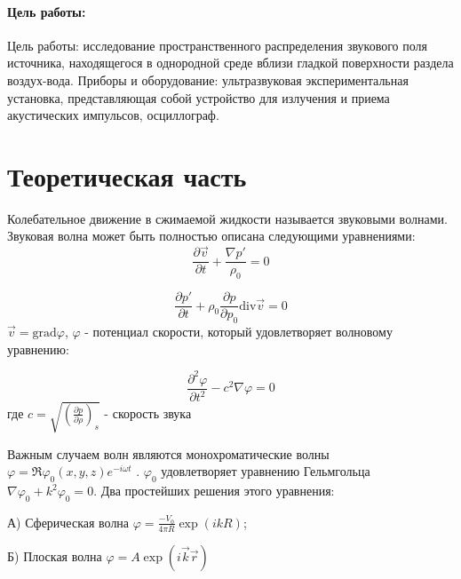 

\def\labauthors{Есюнин Д.В., Есюнин М.В.}
\def\labgroup{440}
\def\labnumber{1}
\def\labtheme{Исследование акустического поля в однородной среде с плоской границей}

\newpage
\renewcommand{\phi}{\varphi}
\renewcommand{\div}{\text{div}}
\renewcommand{\grad}{\text{grad}}

\paragraph{Цель работы:}
Цель работы: исследование пространственного распределения звукового поля источника, находящегося в однородной среде вблизи гладкой поверхности раздела воздух-вода.
Приборы и оборудование: ультразвуковая экспериментальная установка, представляющая собой устройство для излучения и приема акустических импульсов, осциллограф.

\section{Теоретическая часть}
Колебательное движение в сжимаемой жидкости называется звуковыми волнами. Звуковая волна может быть полностью описана следующими уравнениями:
\begin{equation}
	\frac{\partial\vec{v}}{\partial t}+\frac{\nabla p'}{\rho_0}=0
	\label{eq:1}
\end{equation}

\begin{equation}
\frac{\partial p'}{\partial t}+\rho_0 \frac{\partial p}{\partial p_0}\div\vec{v}=0
\label{eq:2}
\end{equation}
 $\vec{v}=\grad\phi$, $\phi$ - потенциал скорости, который удовлетворяет волновому уравнению:
 
 \begin{equation}
 \frac{\partial^2 \phi}{\partial t^2}-c^2 \nabla\phi=0
 \label{eq:3}
 \end{equation}
 где $\displaystyle c=\sqrt{\left(\frac{\partial p}{\partial \rho}\right)_s}$ - скорость звука
 
Важным случаем волн являются монохроматические волны $\phi=\Re{\phi_0(x,y,z)e^{-i\omega t}}$ .
$\phi_0$ удовлетворяет уравнению Гельмгольца $\nabla \phi_0+k^2\phi_0=0$.
Два простейших решения этого уравнения:

А) Сферическая волна  $\displaystyle \phi=\frac{-V_0}{4\pi R}\exp(ikR)$;

Б) Плоская волна $\phi=A\exp(i\vec{k}\vec{r})$

